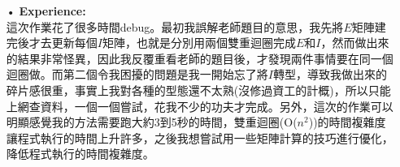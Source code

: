 \documentclass[12pt,a4paper]{article}
\begin{document}
\begin{enumerate}
\newpage
\item[•]
{\bf Experience:}\\
這次作業花了很多時間debug。最初我誤解老師題目的意思，我先將$E$矩陣建完後才去更新每個$I$矩陣，也就是分別用兩個雙重迴圈完成$E$和$I$，然而做出來的結果非常怪異，因此我反覆重看老師的題目後，才發現兩件事情要在同一個迴圈做。而第二個令我困擾的問題是我一開始忘了將$I$轉型，導致我做出來的碎片感很重，事實上我對各種的型態還不太熟(沒修過資工的計概)，所以只能上網查資料，一個一個嘗試，花我不少的功夫才完成。另外，這次的作業可以明顯感覺我的方法需要跑大約3到5秒的時間，雙重迴圈(O($n^2$))的時間複雜度讓程式執行的時間上升許多，之後我想嘗試用一些矩陣計算的技巧進行優化，降低程式執行的時間複雜度。
\end{enumerate}
\end{document}
